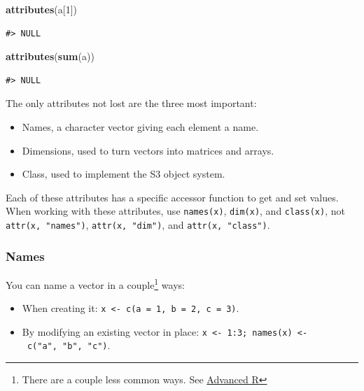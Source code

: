 \documentclass[]{book}
\newenvironment{Shaded}{\begin{snugshade}}{\end{snugshade}}
\newcommand{\KeywordTok}[1]{\textcolor[rgb]{0.13,0.29,0.53}{\textbf{#1}}}
\newcommand{\DecValTok}[1]{\textcolor[rgb]{0.00,0.00,0.81}{#1}}
\newcommand{\NormalTok}[1]{#1}
\let\rmarkdownfootnote\footnote%
\def\footnote{\protect\rmarkdownfootnote}
\theoremstyle{definition}
\theoremstyle{definition}
\theoremstyle{definition}
\theoremstyle{remark}
\begin{document}
\begin{Shaded}
\begin{Highlighting}[]
\KeywordTok{attributes}\NormalTok{(a[}\DecValTok{1}\NormalTok{])}
\end{Highlighting}
\end{Shaded}

\begin{verbatim}
#> NULL
\end{verbatim}

\begin{Shaded}
\begin{Highlighting}[]
\KeywordTok{attributes}\NormalTok{(}\KeywordTok{sum}\NormalTok{(a))}
\end{Highlighting}
\end{Shaded}

\begin{verbatim}
#> NULL
\end{verbatim}

The only attributes not lost are the three most important:

\begin{itemize}
\item
  Names, a character vector giving each element a name.
\item
  Dimensions, used to turn vectors into matrices and arrays.
\item
  Class, used to implement the S3 object system.
\end{itemize}

Each of these attributes has a specific accessor function to get and set
values. When working with these attributes, use \texttt{names(x)},
\texttt{dim(x)}, and \texttt{class(x)}, not \texttt{attr(x,\ "names")},
\texttt{attr(x,\ "dim")}, and \texttt{attr(x,\ "class")}.

\subsubsection{Names}\label{names}

You can name a vector in a couple\footnote{There are a couple less
  common ways. See \href{http://adv-r.had.co.nz}{Advanced R}} ways:

\begin{itemize}
\item
  When creating it:
  \texttt{x\ \textless{}-\ c(a\ =\ 1,\ b\ =\ 2,\ c\ =\ 3)}.
\item
  By modifying an existing vector in place:
  \texttt{x\ \textless{}-\ 1:3;\ names(x)\ \textless{}-\ c("a",\ "b",\ "c")}.
\end{itemize}
\end{document}

